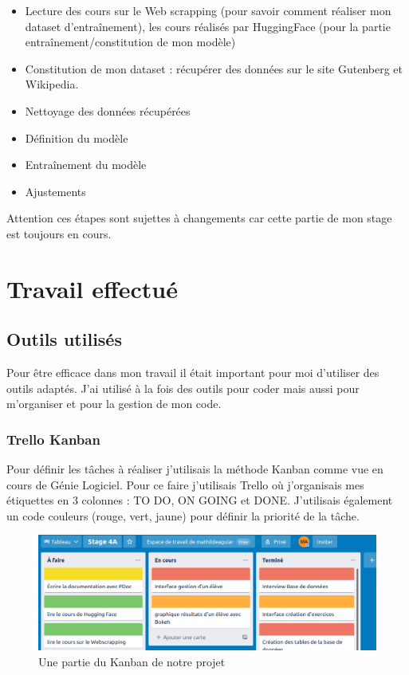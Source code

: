 \documentclass[12pt]{article}
\begin{document}
\begin{itemize}
    \item Lecture des cours sur le Web scrapping (pour savoir comment réaliser mon dataset d'entraînement), les cours réalisés par HuggingFace (pour la partie entraînement/constitution de mon modèle)
    
    \item Constitution de mon dataset : récupérer des données sur le site Gutenberg et Wikipedia.
    
    \item Nettoyage des données récupérées
    
    \item Définition du modèle
    
    \item Entraînement du modèle
    
    \item Ajustements 
\end{itemize}

Attention ces étapes sont sujettes à changements car cette partie de mon stage est toujours en cours.


\section{Travail effectué}
\subsection{Outils utilisés}
Pour être efficace dans mon travail il était important pour moi d'utiliser des outils adaptés. J'ai utilisé à la fois des outils pour coder mais aussi pour m'organiser et pour la gestion de mon code. \\

\subsubsection{Trello Kanban}
Pour définir les tâches à réaliser j’utilisais la méthode Kanban comme vue en cours de Génie Logiciel. Pour ce faire j’utilisais Trello où j’organisais mes étiquettes en 3 colonnes : TO DO, ON GOING et DONE. J’utilisais également un code couleurs (rouge, vert, jaune) pour définir la priorité de la tâche. 

\begin{figure}[h]
    \centering
    \includegraphics[scale=0.4]{trello.png}
    \caption{Une partie du Kanban de notre projet}
    \label{fig:trello}
\end{figure}
\end{document}
